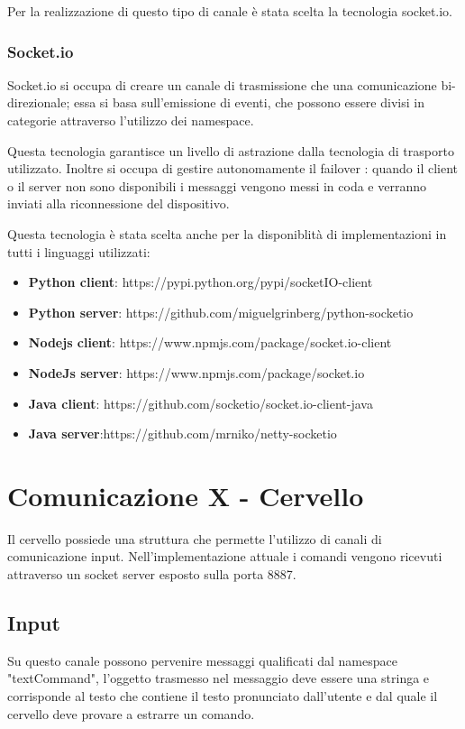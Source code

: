 \documentclass[twoside]{supsistudent}
\begin{document}
Per la realizzazione di questo tipo di canale è stata scelta la tecnologia socket.io. 
\subsection{Socket.io}
Socket.io si occupa di creare un canale di trasmissione che una comunicazione bi-direzionale; essa si basa sull'emissione di eventi, che possono essere divisi in categorie attraverso l'utilizzo dei namespace.

Questa tecnologia garantisce un livello di astrazione dalla tecnologia di trasporto utilizzato. Inoltre si occupa di gestire autonomamente il failover : quando il client o il server non sono disponibili i messaggi vengono messi in coda e verranno inviati alla riconnessione del dispositivo.

Questa tecnologia è stata scelta anche per la disponiblità di implementazioni in tutti i linguaggi utilizzati:
\begin{itemize}
	\item \textbf{Python client}: https://pypi.python.org/pypi/socketIO-client
	\item \textbf{Python server}: https://github.com/miguelgrinberg/python-socketio
	\item \textbf{Nodejs client}: https://www.npmjs.com/package/socket.io-client
	\item \textbf{NodeJs server}: https://www.npmjs.com/package/socket.io
	\item \textbf{Java client}: https://github.com/socketio/socket.io-client-java
	\item \textbf{Java server}:https://github.com/mrniko/netty-socketio
\end{itemize}

\chapter{Comunicazione X - Cervello }
Il cervello possiede una struttura che permette l'utilizzo di canali di comunicazione input. Nell'implementazione attuale i comandi vengono ricevuti attraverso un socket server esposto sulla porta 8887.
\section{Input}
Su questo canale possono pervenire messaggi qualificati dal namespace "textCommand", l'oggetto trasmesso nel messaggio deve essere una stringa e corrisponde al testo che contiene il testo pronunciato dall'utente e dal quale il cervello deve provare a estrarre un comando.
\end{document}
